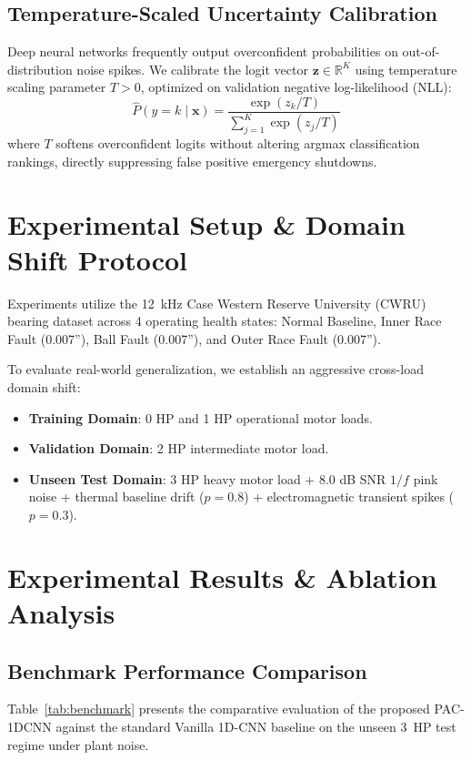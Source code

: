﻿\documentclass[journal,10pt,twocolumn]{IEEEtran}
\begin{document}
\subsection{Temperature-Scaled Uncertainty Calibration}
Deep neural networks frequently output overconfident probabilities on out-of-distribution noise spikes. We calibrate the logit vector $\mathbf{z} \in \mathbb{R}^K$ using temperature scaling parameter $T > 0$, optimized on validation negative log-likelihood (NLL):
\begin{equation}
    \hat{P}(y = k \mid \mathbf{x}) = \frac{\exp(z_k / T)}{\sum_{j=1}^K \exp(z_j / T)}
\end{equation}
where $T$ softens overconfident logits without altering argmax classification rankings, directly suppressing false positive emergency shutdowns.

\section{Experimental Setup \& Domain Shift Protocol}
Experiments utilize the 12~kHz Case Western Reserve University (CWRU) bearing dataset across 4 operating health states: Normal Baseline, Inner Race Fault (0.007''), Ball Fault (0.007''), and Outer Race Fault (0.007'').

To evaluate real-world generalization, we establish an aggressive cross-load domain shift:
\begin{itemize}
    \item \textbf{Training Domain}: 0 HP and 1 HP operational motor loads.
    \item \textbf{Validation Domain}: 2 HP intermediate motor load.
    \item \textbf{Unseen Test Domain}: 3 HP heavy motor load + 8.0 dB SNR $1/f$ pink noise + thermal baseline drift ($p=0.8$) + electromagnetic transient spikes ($p=0.3$).
\end{itemize}

\section{Experimental Results \& Ablation Analysis}

\subsection{Benchmark Performance Comparison}
Table~\ref{tab:benchmark} presents the comparative evaluation of the proposed PAC-1DCNN against the standard Vanilla 1D-CNN baseline on the unseen 3~HP test regime under plant noise.
\end{document}
